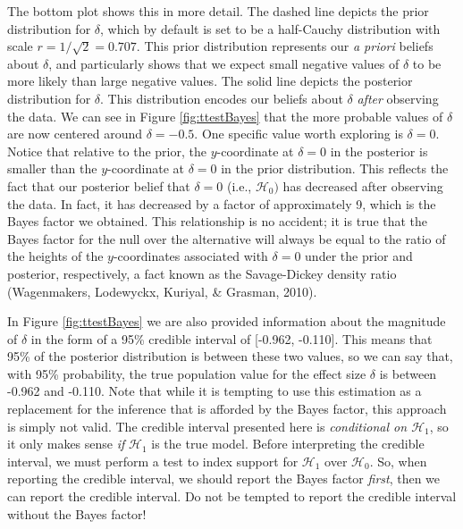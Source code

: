 \documentclass[english,,doc,floatsintext]{apa6}
\begin{document}
The bottom plot shows this in more detail. The dashed line depicts the prior distribution for \(\delta\), which by default is set to be a half-Cauchy distribution with scale \(r=1/\sqrt{2} = 0.707\). This prior distribution represents our \emph{a priori} beliefs about \(\delta\), and particularly shows that we expect small negative values of \(\delta\) to be more likely than large negative values. The solid line depicts the posterior distribution for \(\delta\). This distribution encodes our beliefs about \(\delta\) \emph{after} observing the data. We can see in Figure \ref{fig:ttestBayes} that the more probable values of \(\delta\) are now centered around \(\delta = -0.5\). One specific value worth exploring is \(\delta=0\). Notice that relative to the prior, the \(y\)-coordinate at \(\delta=0\) in the posterior is smaller than the \(y\)-coordinate at \(\delta=0\) in the prior distribution. This reflects the fact that our posterior belief that \(\delta=0\) (i.e., \(\mathcal{H}_0)\) has decreased after observing the data. In fact, it has decreased by a factor of approximately 9, which is the Bayes factor we obtained. This relationship is no accident; it is true that the Bayes factor for the null over the alternative will always be equal to the ratio of the heights of the \(y\)-coordinates associated with \(\delta=0\) under the prior and posterior, respectively, a fact known as the Savage-Dickey density ratio (Wagenmakers, Lodewyckx, Kuriyal, \& Grasman, 2010).

In Figure \ref{fig:ttestBayes} we are also provided information about the magnitude of \(\delta\) in the form of a 95\% credible interval of {[}-0.962, -0.110{]}. This means that 95\% of the posterior distribution is between these two values, so we can say that, with 95\% probability, the true population value for the effect size \(\delta\) is between -0.962 and -0.110. Note that while it is tempting to use this estimation as a replacement for the inference that is afforded by the Bayes factor, this approach is simply not valid. The credible interval presented here is \emph{conditional on \(\mathcal{H}_{1}\)}, so it only makes sense \emph{if} \(\mathcal{H}_{1}\) is the true model. Before interpreting the credible interval, we must perform a test to index support for \(\mathcal{H}_{1}\) over \(\mathcal{H}_{0}\). So, when reporting the credible interval, we should report the Bayes factor \emph{first}, then we can report the credible interval. Do not be tempted to report the credible interval without the Bayes factor!
\end{document}
